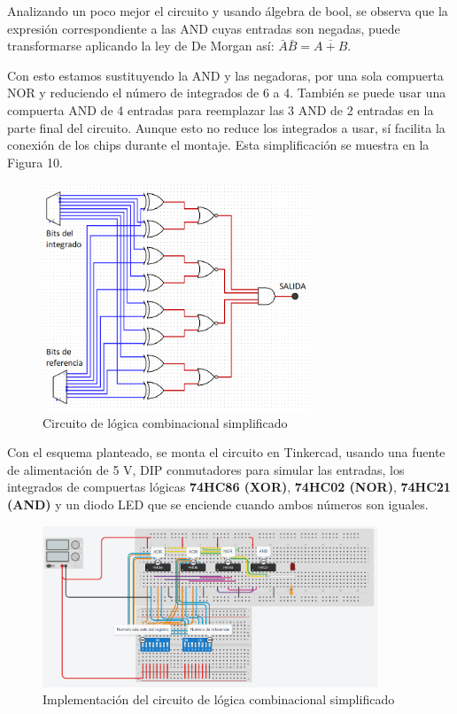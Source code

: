 \documentclass{article}
\begin{document}
Analizando un poco mejor el circuito y usando álgebra de bool, se observa que la expresión correspondiente a las AND cuyas entradas son negadas, puede transformarse aplicando la ley de De Morgan así: $\bar{A}\bar{B} = \overline{A+B}$.

Con esto estamos sustituyendo la AND y las negadoras, por una sola compuerta NOR y reduciendo el número de integrados de 6 a 4. También se puede usar una compuerta AND de 4 entradas para reemplazar las 3 AND de 2 entradas en la parte final del circuito. Aunque esto no reduce los integrados a usar, sí facilita la conexión de los chips durante el montaje. Esta simplificación se muestra en la Figura 10.

\begin{figure}[!hb] 
\includegraphics[width=8cm]{logica2.png}
\centering
\caption{Circuito de lógica combinacional simplificado}
\end{figure}

Con el esquema planteado, se monta el circuito en Tinkercad, usando una fuente de alimentación de 5 V, DIP conmutadores para simular las entradas, los integrados de compuertas lógicas \textbf{74HC86 (XOR)}, \textbf{74HC02 (NOR)}, \textbf{74HC21 (AND)} y un diodo LED que se enciende cuando ambos números son iguales.\\

\begin{figure}[!ht] 
\includegraphics[width=10cm]{montajeCompuertas.PNG}
\centering
\caption{Implementación del circuito de lógica combinacional simplificado}
\end{figure}
\end{document}
